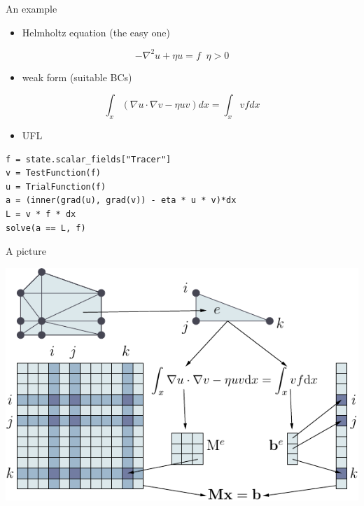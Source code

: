 \documentclass[bigger]{beamer}
\begin{document}
\begin{frame}[fragile,label={sec:orgheadline18}]{An example}
 \begin{itemize}
\item Helmholtz equation (the easy one)
\end{itemize}
\begin{displaymath}
-\nabla^2 u + \eta u = f \;\; \eta > 0
\end{displaymath}
\begin{itemize}
\item weak form (suitable BCs)
\end{itemize}
\begin{displaymath}
\int_x (\nabla u \cdot \nabla v - \eta u v) dx = \int_x v f dx
\end{displaymath}
\begin{itemize}
\item UFL
\end{itemize}
\begin{verbatim}
f = state.scalar_fields["Tracer"]
v = TestFunction(f)
u = TrialFunction(f)
a = (inner(grad(u), grad(v)) - eta * u * v)*dx
L = v * f * dx
solve(a == L, f)
\end{verbatim}
\end{frame}

\begin{frame}[label={sec:orgheadline19}]{A picture}
\begin{center}
\includegraphics[width=.9\linewidth]{01-22-HIPEAC-PyOP2.figures/assembly-crop.pdf}
\end{center}
\end{frame}
\end{document}
